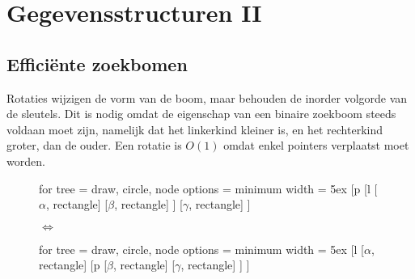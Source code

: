 \documentclass{report}
\begin{document}
	\tableofcontents
	\part{Gegevensstructuren II}
	\chapter{Efficiënte zoekbomen}
	Rotaties wijzigen de vorm van de boom, maar behouden de inorder volgorde van de sleutels. Dit is nodig omdat de eigenschap van een binaire zoekboom steeds voldaan moet zijn, namelijk dat het linkerkind kleiner is, en het rechterkind groter, dan de ouder. Een rotatie is $O(1)$ omdat enkel pointers verplaatst moet worden.
	\begin{figure}[ht]
		\centering
		\begin{adjustbox}{valign=t}
			
			\begin{forest}
				for tree = {draw, circle, node options = {minimum width = 5ex}}
				[p
					[l
						[$\alpha$, rectangle]
						[$\beta$, rectangle]
					]
					[$\gamma$, rectangle]
				]	
			\end{forest}
		\end{adjustbox}\qquad
		\begin{adjustbox}{valign=c}
		$\Leftrightarrow$
		\end{adjustbox}\qquad
		\begin{adjustbox}{valign=t}
			\begin{forest}
				for tree = {draw, circle, node options = {minimum width = 5ex}}
				[l
					[$\alpha$, rectangle]
					[p
						[$\beta$, rectangle]
						[$\gamma$, rectangle]	
					]
				]	
			\end{forest}
		\end{adjustbox}
	\end{figure}
	
\end{document}

